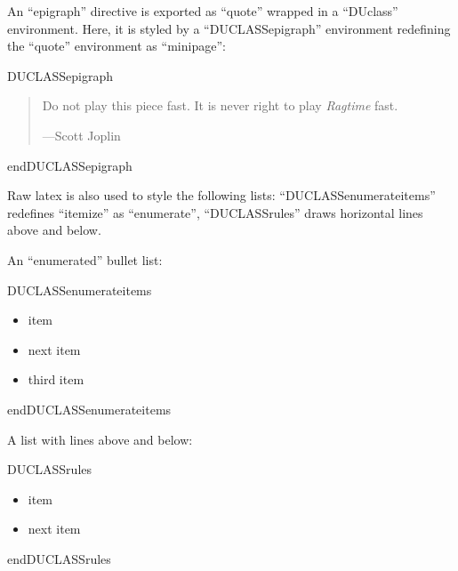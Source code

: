 \documentclass[a4paper]{article}
\newenvironment{DUclass}[1]%
    {%
     \def\DocutilsClassFunctionName{DUCLASS#1}
     \csname \DocutilsClassFunctionName \endcsname}%
    {\csname end\DocutilsClassFunctionName \endcsname}%
\begin{document}
An “epigraph” directive is exported as “quote” wrapped in a “DUclass”
environment. Here, it is styled by a “DUCLASSepigraph” environment
redefining the “quote” environment as “minipage”:

\newcommand*{\DUCLASSepigraph}{%
  \renewenvironment{quote}{\vspace{1em}
                           \footnotesize\hfill{}%
                           \begin{minipage}{0.4\columnwidth}}%
                          {\end{minipage}\vskip\baselineskip}}

\begin{DUclass}{epigraph}
\begin{quote}
Do not play this piece fast. It is never right to play \emph{Ragtime} fast.
\nopagebreak

\raggedleft —Scott Joplin
\end{quote}
\end{DUclass}

Raw latex is also used to style the following lists: “DUCLASSenumerateitems”
redefines “itemize” as “enumerate”, “DUCLASSrules” draws horizontal lines
above and below.

\newcommand*{\DUCLASSenumerateitems}{%
  \renewenvironment{itemize}{\begin{enumerate}}%
                            {\end{enumerate}}%
}

\newenvironment{DUCLASSrules}%
               {\noindent\rule[0.5ex]{1\columnwidth}{1pt}}%
               {\noindent\rule[0.5ex]{1\columnwidth}{1pt}}

An “enumerated” bullet list:

\begin{DUclass}{enumerateitems}
\begin{itemize}
\item item

\item next item

\item third item
\end{itemize}
\end{DUclass}

A list with lines above and below:

\begin{DUclass}{rules}
\begin{itemize}
\item item

\item next item
\end{itemize}
\end{DUclass}
\end{document}
